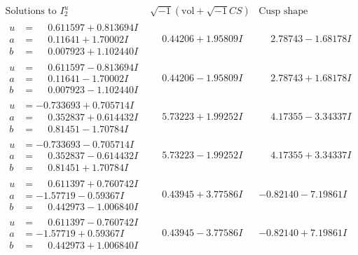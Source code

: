 \documentclass[1p]{elsarticle_modified}
\theoremstyle{definition}
\newcommand{\I}{\sqrt{-1}}
\begin{document}
$$\begin{array}{c|c|c}  
\text{Solutions to }I^u_{2}& \I (\text{vol} + \sqrt{-1}CS) & \text{Cusp shape}\\
 \hline 
\begin{aligned}
u &= \phantom{-}0.611597 + 0.813694 I \\
a &= \phantom{-}0.11641 + 1.70002 I \\
b &= \phantom{-}0.007923 + 1.102440 I\end{aligned}
 & \phantom{-}0.44206 + 1.95809 I & \phantom{-}2.78743 - 1.68178 I \\ \hline\begin{aligned}
u &= \phantom{-}0.611597 - 0.813694 I \\
a &= \phantom{-}0.11641 - 1.70002 I \\
b &= \phantom{-}0.007923 - 1.102440 I\end{aligned}
 & \phantom{-}0.44206 - 1.95809 I & \phantom{-}2.78743 + 1.68178 I \\ \hline\begin{aligned}
u &= -0.733693 + 0.705714 I \\
a &= \phantom{-}0.352837 + 0.614432 I \\
b &= \phantom{-}0.81451 - 1.70784 I\end{aligned}
 & \phantom{-}5.73223 + 1.99252 I & \phantom{-}4.17355 - 3.34337 I \\ \hline\begin{aligned}
u &= -0.733693 - 0.705714 I \\
a &= \phantom{-}0.352837 - 0.614432 I \\
b &= \phantom{-}0.81451 + 1.70784 I\end{aligned}
 & \phantom{-}5.73223 - 1.99252 I & \phantom{-}4.17355 + 3.34337 I \\ \hline\begin{aligned}
u &= \phantom{-}0.611397 + 0.760742 I \\
a &= -1.57719 - 0.59367 I \\
b &= \phantom{-}0.442973 - 1.006840 I\end{aligned}
 & \phantom{-}0.43945 + 3.77586 I & -0.82140 - 7.19861 I \\ \hline\begin{aligned}
u &= \phantom{-}0.611397 - 0.760742 I \\
a &= -1.57719 + 0.59367 I \\
b &= \phantom{-}0.442973 + 1.006840 I\end{aligned}
 & \phantom{-}0.43945 - 3.77586 I & -0.82140 + 7.19861 I \\ \hline\begin{aligned}

\end{aligned}
\end{array}$$
\end{document}
